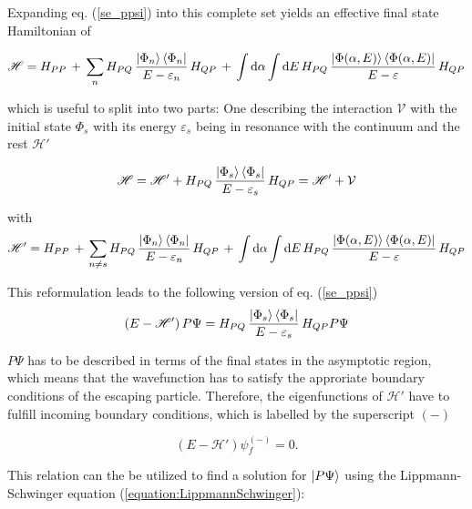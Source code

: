 Expanding eq. (\ref{se_ppsi}) into this complete set yields an effective
final state Hamiltonian of

\begin{equation}
  \mathscr{H} = H_{PP}\, + \,
  \sum\limits_n H_{PQ} \,\frac{\ket{\Phi_n}\bra{\Phi_n}}{E-\varepsilon_n}\, H_{QP} \,+\,
  \int \mathrm{d}\alpha \int\mathrm{d}E \,H_{PQ} \,
  \frac{\ket{\Phi(\alpha,E)}\bra{\Phi(\alpha,E)}}{E-\varepsilon} \, H_{QP}
\end{equation}

which is useful to split into two parts: One describing the interaction
$\mathcal{V}$ with the
initial state $\Phi_s$ with its energy $\varepsilon_s$ being in resonance with
the continuum and the rest $\mathscr{H}'$

\begin{equation}
  \mathscr{H} = \mathscr{H}' +
                H_{PQ} \,\frac{\ket{\Phi_s}\bra{\Phi_s}}{E-\varepsilon_s}\, H_{QP}
              = \mathscr{H}' + \mathcal{V}
\end{equation}

with
\begin{equation}
  \mathscr{H}' = H_{PP}\, + \,
  \sum\limits_{n\ne s} H_{PQ} \,\frac{\ket{\Phi_n}\bra{\Phi_n}}{E-\varepsilon_n}
  \, H_{QP} \,+\,
  \int \mathrm{d}\alpha \int\mathrm{d}E \,H_{PQ} \,
  \frac{\ket{\Phi(\alpha,E)}\bra{\Phi(\alpha,E)}}{E-\varepsilon} \, H_{QP}
\end{equation}

This reformulation leads to the following version of eq. (\ref{se_ppsi})
\begin{equation}
  (E - \mathscr{H}')\, P \Psi =
   H_{PQ} \,\frac{\ket{\Phi_s}\bra{\Phi_s}}{E-\varepsilon_s}\, H_{QP} P \Psi %
\end{equation}

$P \Psi$ has to be described in terms of the final states in the asymptotic
region, which means that the wavefunction has to satisfy the approriate
boundary conditions of the escaping particle. Therefore,
the eigenfunctions of $\mathscr{H}'$ have to fulfill incoming boundary conditions,
which is labelled by the superscript $(-)$

\begin{equation}
  (E-\mathscr{H}') \psi_f^{(-)} = 0 \label{sol_outg} .
\end{equation}

This relation can the be utilized to find a solution for $\ket{P \Psi}$
using the Lippmann-Schwinger equation (\ref{equation:LippmannSchwinger}):

